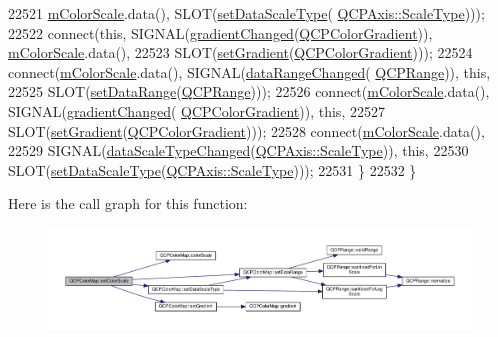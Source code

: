 \begin{DoxyCode}
22521             \hyperlink{class_q_c_p_color_map_a95b4100bacc3387652c988b071ec9db7}{mColorScale}.data(), SLOT(\hyperlink{class_q_c_p_color_map_a9d20aa08e3c1f20f22908c45b9c06511}{setDataScaleType}(
      \hyperlink{class_q_c_p_axis_a36d8e8658dbaa179bf2aeb973db2d6f0}{QCPAxis::ScaleType})));
22522     connect(\textcolor{keyword}{this}, SIGNAL(\hyperlink{class_q_c_p_color_map_abf4797f86e422ac6e0f732c4ff1a4d49}{gradientChanged}(\hyperlink{class_q_c_p_color_gradient}{QCPColorGradient})), 
      \hyperlink{class_q_c_p_color_map_a95b4100bacc3387652c988b071ec9db7}{mColorScale}.data(),
22523             SLOT(\hyperlink{class_q_c_p_color_map_a7313c78360471cead3576341a2c50377}{setGradient}(\hyperlink{class_q_c_p_color_gradient}{QCPColorGradient})));
22524     connect(\hyperlink{class_q_c_p_color_map_a95b4100bacc3387652c988b071ec9db7}{mColorScale}.data(), SIGNAL(\hyperlink{class_q_c_p_color_map_a482980f2335d09cfb36dd95ba9663197}{dataRangeChanged}(
      \hyperlink{class_q_c_p_range}{QCPRange})), \textcolor{keyword}{this},
22525             SLOT(\hyperlink{class_q_c_p_color_map_a980b42837821159786a85b4b7dcb8774}{setDataRange}(\hyperlink{class_q_c_p_range}{QCPRange})));
22526     connect(\hyperlink{class_q_c_p_color_map_a95b4100bacc3387652c988b071ec9db7}{mColorScale}.data(), SIGNAL(\hyperlink{class_q_c_p_color_map_abf4797f86e422ac6e0f732c4ff1a4d49}{gradientChanged}(
      \hyperlink{class_q_c_p_color_gradient}{QCPColorGradient})), \textcolor{keyword}{this},
22527             SLOT(\hyperlink{class_q_c_p_color_map_a7313c78360471cead3576341a2c50377}{setGradient}(\hyperlink{class_q_c_p_color_gradient}{QCPColorGradient})));
22528     connect(\hyperlink{class_q_c_p_color_map_a95b4100bacc3387652c988b071ec9db7}{mColorScale}.data(),
22529             SIGNAL(\hyperlink{class_q_c_p_color_map_a978d5d5c9f68cffef8c902b855c04490}{dataScaleTypeChanged}(\hyperlink{class_q_c_p_axis_a36d8e8658dbaa179bf2aeb973db2d6f0}{QCPAxis::ScaleType})), \textcolor{keyword}{this},
22530             SLOT(\hyperlink{class_q_c_p_color_map_a9d20aa08e3c1f20f22908c45b9c06511}{setDataScaleType}(\hyperlink{class_q_c_p_axis_a36d8e8658dbaa179bf2aeb973db2d6f0}{QCPAxis::ScaleType})));
22531   \}
22532 \}
\end{DoxyCode}


Here is the call graph for this function\+:\nopagebreak
\begin{figure}[H]
\begin{center}
\leavevmode
\includegraphics[width=350pt]{class_q_c_p_color_map_aa828921db364fe3c6af4619580ab85fd_cgraph}
\end{center}
\end{figure}



